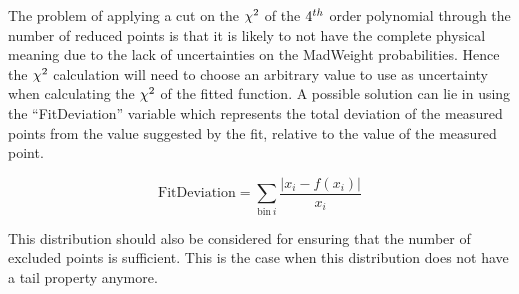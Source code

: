 The problem of applying a cut on the $\chi^{2}$ of the $4^{th}$ order polynomial through the number of reduced points is that it is likely to not have the complete physical meaning due to the lack of uncertainties on the MadWeight probabilities. Hence the $\chi^{2}$ calculation will need to choose an arbitrary value to use as uncertainty when calculating the $\chi^{2}$ of the fitted function.
A possible solution can lie in using the ``FitDeviation'' variable which represents the total deviation of the measured points from the value suggested by the fit, relative to the value of the measured point.

\begin{equation}
 \textrm{FitDeviation} = \sum_{\textrm{bin}~i} \frac{\vert x_i - f(x_i) \vert}{x_i}
\end{equation}

This distribution should also be considered for ensuring that the number of excluded points is sufficient. This is the case when this distribution does not have a tail property anymore.
